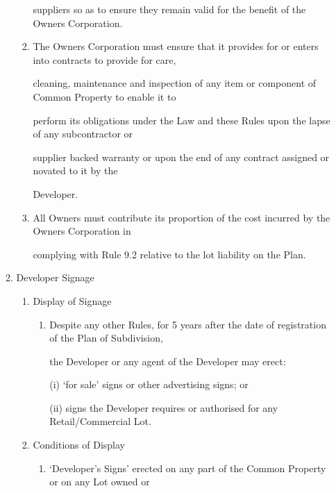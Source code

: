 \documentclass{article}
\begin{document}
\begin{enumerate}[label=\arabic*.]
\begin{enumerate}[label=\arabic{enumi}.\arabic*.]
\begin{enumerate}[label=(\arabic*)]
{\fontsize{10.02}{1}suppliers so as to ensure they remain valid for the benefit of the Owners Corporation. }

\item {\fontsize{9.962}{1} The Owners Corporation must ensure that it provides for or enters into contracts to provide for care, }

{\fontsize{10.02}{1}cleaning, maintenance and inspection of any item or component of Common Property to enable it to }

{\fontsize{10.02}{1}perform its obligations under the Law and these Rules upon the lapse of any subcontractor or }

{\fontsize{10.02}{1}supplier backed warranty or upon the end of any contract assigned or novated to it by the }

{\fontsize{10.02}{1}Developer. }

\item {\fontsize{9.962}{1} All Owners must contribute its proportion of the cost incurred by the Owners Corporation in }

{\fontsize{10.02}{1}complying with Rule 9.2 relative to the lot liability on the Plan. }

\end{enumerate}
\item {\fontsize{9.99}{1} Developer Signage }

\begin{enumerate}[label=(\arabic*)]
\item {\fontsize{9.962}{1} Display of Signage }

\begin{enumerate}[label=(\alph*)]
\item {\fontsize{9.962}{1} Despite any other Rules, for 5 years after the date of registration of the Plan of Subdivision, }

{\fontsize{10.02}{1}the Developer or any agent of the Developer may erect: }

{\fontsize{9.962}{1}(i) ‘for sale’ signs or other advertising signs; or }

{\fontsize{9.962}{1}(ii) signs the Developer requires or authorised for any Retail/Commercial Lot. }

\end{enumerate}
\item {\fontsize{9.962}{1} Conditions of Display }

\begin{enumerate}[label=(\alph*)]
\item {\fontsize{9.962}{1} ‘Developer’s Signs’ erected on any part of the Common Property or on any Lot owned or }


\end{enumerate}
\end{enumerate}
\end{enumerate}
\end{enumerate}
\end{document}
